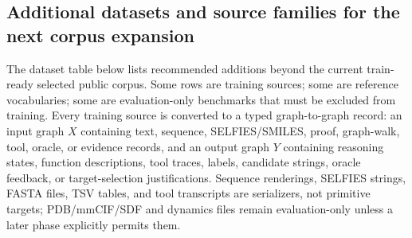 \documentclass[11pt]{article}
\newcommand{\1}{\mathbf{1}}
\begin{document}
\subsection{Additional datasets and source families for the next corpus expansion}
\label{sec:additional-datasets}

The dataset table below lists recommended additions beyond the current train-ready selected public corpus. Some rows are training sources; some are reference vocabularies; some are evaluation-only benchmarks that must be excluded from training. Every training source is converted to a typed graph-to-graph record: an input graph $X$ containing text, sequence, SELFIES/SMILES, proof, graph-walk, tool, oracle, or evidence records, and an output graph $Y$ containing reasoning states, function descriptions, tool traces, labels, candidate strings, oracle feedback, or target-selection justifications. Sequence renderings, SELFIES strings, FASTA files, TSV tables, and tool transcripts are serializers, not primitive targets; PDB/mmCIF/SDF and dynamics files remain evaluation-only unless a later phase explicitly permits them.
\end{document}

